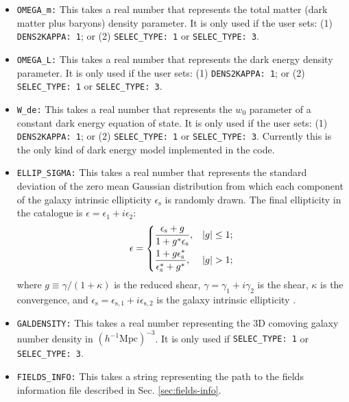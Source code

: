 \documentclass[12pt]{book} %
\newcommand{\nv}[1]{\mathrm{#1}}                 %
\begin{document}
\begin{itemize}
\item {\tt OMEGA\_m:} This takes a real number that represents the total matter (dark matter 
  plus baryons) density parameter. It is only used if the user sets: (1) {\tt DENS2KAPPA: 1}; or 
  (2) {\tt SELEC\_TYPE: 1} or {\tt SELEC\_TYPE: 3}.

\item {\tt OMEGA\_L:} This takes a real number that represents the dark energy density parameter. 
  It is only used if the user sets: (1) {\tt DENS2KAPPA: 1}; or (2) {\tt SELEC\_TYPE: 1} or {\tt SELEC\_TYPE: 3}. 

\item {\tt W\_de:} This takes a real number that represents the $w_0$ parameter of a constant dark energy 
  equation of state. It is only used if the user sets: (1) {\tt DENS2KAPPA: 1}; or (2) {\tt SELEC\_TYPE: 1} 
  or {\tt SELEC\_TYPE: 3}. Currently this is the only kind of dark energy model implemented in the code. 

\item {\tt ELLIP\_SIGMA:} This takes a real number that represents the standard deviation of the zero mean 
  Gaussian distribution from which each component of the galaxy intrinsic ellipticity $\epsilon_{\nv{s}}$ 
  is randomly drawn. The final ellipticity in the catalogue is $\epsilon=\epsilon_1+i\epsilon_2$:
  \begin{equation}
    \epsilon = 
    \begin{dcases}
      \frac{\epsilon_{\nv{s}}+g}{1+g^{*}\epsilon_{\nv{s}}}, & |g|\leq 1; \\
      \frac{1+g\epsilon_{\nv{s}}^{*}}{\epsilon_{\nv{s}}^{*}+g^{*}}, & |g|>1;\\
    \end{dcases}
    \label{eq:ellipticity}
  \end{equation}
  where $g\equiv \gamma/(1+\kappa)$ is the reduced shear, $\gamma=\gamma_1+i\gamma_2$ is the shear, $\kappa$ is the 
  convergence, and $\epsilon_{\nv{s}}=\epsilon_{\nv{s},1}+i\epsilon_{\nv{s},2}$ is the galaxy intrinsic 
  ellipticity \citep[we follow ][eq. 4.12]{Bartelmann01mn}.
  
\item {\tt GALDENSITY:} This takes a real number representing the 3D comoving galaxy number 
  density in $(h^{-1}\nv{Mpc})^{-3}$. It is only used if {\tt SELEC\_TYPE: 1} or {\tt SELEC\_TYPE: 3}. 

\item {\tt FIELDS\_INFO:} This takes a string representing the path to the fields information file 
  described in Sec. \ref{sec:fields-info}.


\end{itemize}
\end{document}
